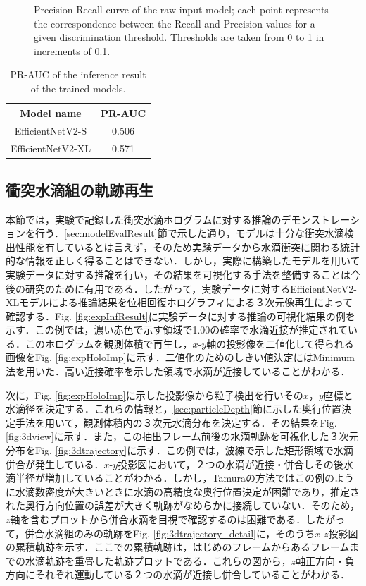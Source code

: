 \begin{figure}[H]
    \caption{Precision-Recall curve of the raw-input model; each point represents the correspondence between the Recall and Precision values for a given discrimination threshold. Thresholds are taken from 0 to 1 in increments of 0.1.} 
    \label{fig:prcurve}
\end{figure}

\begin{table}[H]
    \centering
    \caption{PR-AUC of the inference result of the trained models. }
    \begin{tabular}{cc}
        Model name & PR-AUC \\ \hline \hline
        EfficientNetV2-S & 0.506 \\ \hline
        EfficientNetV2-XL & 0.571 \\
    \end{tabular}
    \label{table:prauc}
\end{table}

\subsection{衝突水滴組の軌跡再生}
本節では，実験で記録した衝突水滴ホログラムに対する推論のデモンストレーションを行う．\ref{sec:modelEvalResult}節で示した通り，モデルは十分な衝突水滴検出性能を有しているとは言えず，そのため実験データから水滴衝突に関わる統計的な情報を正しく得ることはできない．しかし，実際に構築したモデルを用いて実験データに対する推論を行い，その結果を可視化する手法を整備することは今後の研究のために有用である．したがって，実験データに対するEfficientNetV2-XLモデルによる推論結果を位相回復ホログラフィによる３次元像再生によって確認する．Fig. \ref{fig:expInfResult}に実験データに対する推論の可視化結果の例を示す．この例では，濃い赤色で示す領域で\num{1.00}の確率で水滴近接が推定されている．このホログラムを観測体積で再生し，$x$-$y$軸の投影像を二値化して得られる画像をFig. \ref{fig:expHoloImp}に示す．二値化のためのしきい値決定にはMinimum法\cite{prewitt1966}を用いた．高い近接確率を示した領域で水滴が近接していることがわかる．

次に，Fig. \ref{fig:expHoloImp}に示した投影像から粒子検出を行いその$x$，$y$座標と水滴径を決定する．これらの情報と，\ref{sec:particleDepth}節に示した奥行位置決定手法を用いて，観測体積内の３次元水滴分布を決定する．その結果をFig. \ref{fig:3dview}に示す．また，この抽出フレーム前後の水滴軌跡を可視化した３次元分布をFig. \ref{fig:3dtrajectory}に示す．この例では，波線で示した矩形領域で水滴併合が発生している．$x$-$y$投影図において，２つの水滴が近接・併合しその後水滴半径が増加していることがわかる．しかし，Tamuraの方法ではこの例のように水滴数密度が大きいときに水滴の高精度な奥行位置決定が困難であり，推定された奥行方向位置の誤差が大きく軌跡がなめらかに接続していない．そのため，$z$軸を含むプロットから併合水滴を目視で確認するのは困難である．したがって，併合水滴組のみの軌跡をFig. \ref{fig:3dtrajectory_detail}に，そのうち$x$-$z$投影図の累積軌跡を示す．ここでの累積軌跡は，はじめのフレームからあるフレームまでの水滴軌跡を重畳した軌跡プロットである．これらの図から，$z$軸正方向・負方向にそれぞれ運動している２つの水滴が近接し併合していることがわかる．

